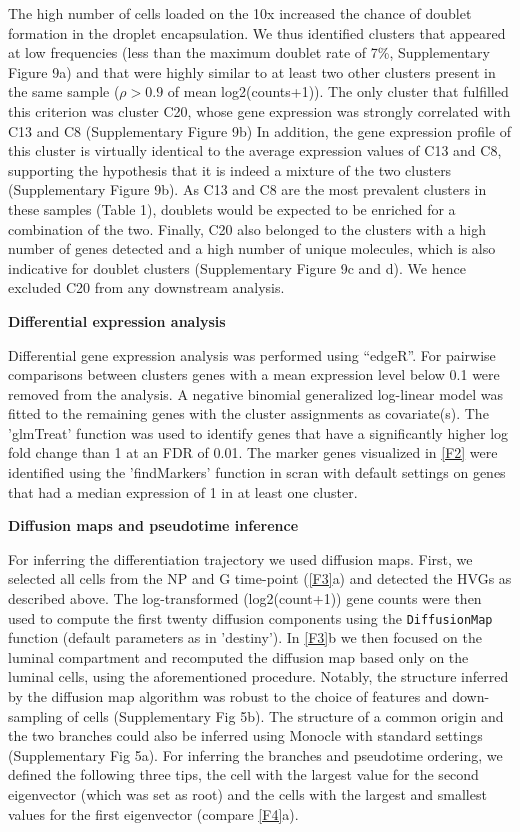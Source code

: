 \documentclass[titlepage, 12pt, oneside]{amsart}
\begin{document}
The high number of cells loaded on the 10x increased the chance of doublet formation in the droplet encapsulation\autocite{Zheng2017}. 
We thus identified clusters that appeared at low frequencies (less than the maximum doublet rate of 7\%, Supplementary Figure 9a) and that were highly similar to at least two other clusters present in the same sample ($\rho > 0.9$ of mean log2(counts+1)).
The only cluster that fulfilled this criterion was cluster C20, whose gene expression was strongly correlated with C13 and C8 (Supplementary Figure 9b)
In addition, the gene expression profile of this cluster is virtually identical to the average expression values of C13 and C8, supporting the hypothesis that it is indeed a mixture of the two clusters (Supplementary Figure 9b).
As C13 and C8 are the most prevalent clusters in these samples (Table 1), doublets would be expected to be enriched for a combination of the two.
Finally, C20 also belonged to the clusters with a high number of genes detected and a high number of unique molecules, which is also indicative for doublet clusters (Supplementary Figure 9c and d).
We hence excluded C20 from any downstream analysis.

\textbf{Differential expression analysis }

Differential gene expression analysis was performed using ``edgeR''\autocite{Robinson2010}.
For pairwise comparisons between clusters genes with a mean expression level below 0.1 were removed from the analysis.
A negative binomial generalized log-linear model was fitted to the remaining genes with the cluster assignments as covariate(s).
The 'glmTreat' function was used to identify genes that have a significantly higher log fold change than 1 at an FDR of 0.01.
The marker genes visualized in \autoref{F2} were identified using the 'findMarkers' function in scran with default settings on genes that had a median expression of 1 in at least one cluster\autocite{Lun2016a}.

\textbf{Diffusion maps and pseudotime inference}

For inferring the differentiation trajectory we used diffusion maps.
First, we selected all cells from the NP and G time-point (\autoref{F3}a) and detected the HVGs as described above.
The log-transformed (log2(count+1)) gene counts were then used to compute the first twenty diffusion components using the \texttt{DiffusionMap} function (default parameters as in 'destiny'\autocite{Angerer2016}).
In \autoref{F3}b we then focused on the luminal compartment and recomputed the diffusion map based only on the luminal cells, using the aforementioned procedure.
Notably, the structure inferred by the diffusion map algorithm was robust to the choice of features and down-sampling of cells (Supplementary Fig 5b).
The structure of a common origin and the two branches could also be inferred using Monocle with standard settings\autocite{Trapnell2014} (Supplementary Fig 5a).
For inferring the branches and pseudotime ordering, we defined the following three tips, the cell with the largest value for the second eigenvector (which was set as root) and the cells with the largest and smallest values for the first eigenvector (compare \autoref{F4}a).  
\end{document}
